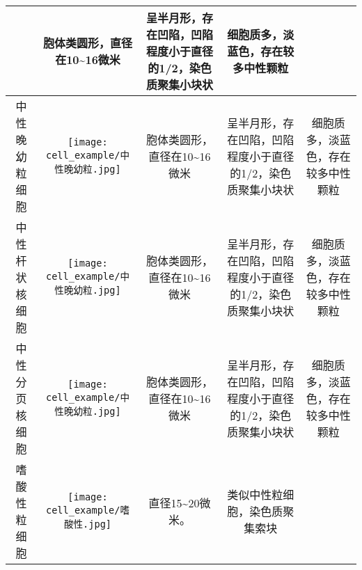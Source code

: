 \begin{longtable}{ccccc}
{\begin{minipage}[b]{0.15\textwidth}
  \end{minipage}} &  
  \multicolumn{1}{m{0.15\textwidth}}{胞体类圆形，直径在10\textasciitilde16微米} & 
  \multicolumn{1}{m{0.20\textwidth}}{呈半月形，存在凹陷，凹陷程度小于直径的1/2，染色质聚集小块状} & 
  \multicolumn{1}{m{0.20\textwidth}}{细胞质多，淡蓝色，存在较多中性颗粒}\\
  \midrule[0.5pt]
  中性晚幼粒细胞 & 
  \multicolumn{1}{m{0.15\textwidth}}{
  \begin{minipage}[b]{0.15\textwidth}
      \centering
      {\texttt{[image: cell\_example/中性晚幼粒.jpg]}}
  \end{minipage}} &  
  \multicolumn{1}{m{0.15\textwidth}}{胞体类圆形，直径在10\textasciitilde16微米} & 
  \multicolumn{1}{m{0.20\textwidth}}{呈半月形，存在凹陷，凹陷程度小于直径的1/2，染色质聚集小块状} & 
  \multicolumn{1}{m{0.20\textwidth}}{细胞质多，淡蓝色，存在较多中性颗粒}\\
  \midrule[0.5pt]
  中性杆状核细胞 & 
  \multicolumn{1}{m{0.15\textwidth}}{
  \begin{minipage}[b]{0.15\textwidth}
      \centering
      {\texttt{[image: cell\_example/中性晚幼粒.jpg]}}
  \end{minipage}} &  
  \multicolumn{1}{m{0.15\textwidth}}{胞体类圆形，直径在10\textasciitilde16微米} & 
  \multicolumn{1}{m{0.20\textwidth}}{呈半月形，存在凹陷，凹陷程度小于直径的1/2，染色质聚集小块状} & 
  \multicolumn{1}{m{0.20\textwidth}}{细胞质多，淡蓝色，存在较多中性颗粒}\\
  \midrule[0.5pt]
  中性分页核细胞 & 
  \multicolumn{1}{m{0.15\textwidth}}{
  \begin{minipage}[b]{0.15\textwidth}
      \centering
      {\texttt{[image: cell\_example/中性晚幼粒.jpg]}}
  \end{minipage}} &  
  \multicolumn{1}{m{0.15\textwidth}}{胞体类圆形，直径在10\textasciitilde16微米} & 
  \multicolumn{1}{m{0.20\textwidth}}{呈半月形，存在凹陷，凹陷程度小于直径的1/2，染色质聚集小块状} & 
  \multicolumn{1}{m{0.20\textwidth}}{细胞质多，淡蓝色，存在较多中性颗粒}\\
  \midrule[0.5pt]
  嗜酸性粒细胞 & 
  \multicolumn{1}{m{0.15\textwidth}}{
  \begin{minipage}[b]{0.15\textwidth}
      \centering
      {\texttt{[image: cell\_example/嗜酸性.jpg]}}
  \end{minipage}} &  
  \multicolumn{1}{m{0.15\textwidth}}{直径15\textasciitilde20微米。} & 
  \multicolumn{1}{m{0.20\textwidth}}{类似中性粒细胞，染色质聚集索块} & 

\end{longtable}
